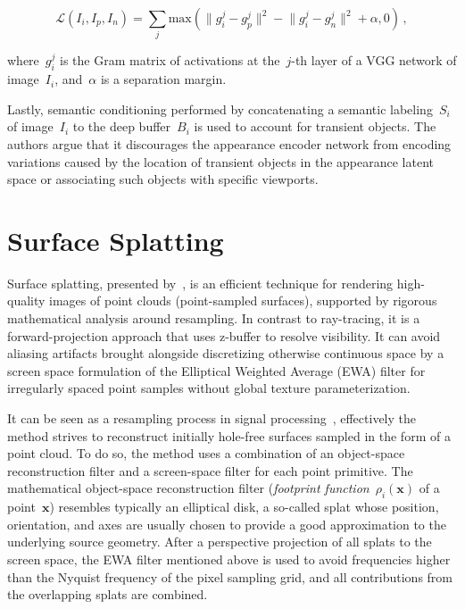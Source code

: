 $$\mathcal{L}(I_i, I_p, I_n) = \sum_j \mathrm{max}\left(\lVert g_i^j-g_p^j\rVert^2 - \lVert g_i^j-g_n^j\rVert^2 + \alpha, 0\right)\,,$$

where~$g_i^j$ is the Gram matrix of activations at the~$j$-th layer of a VGG network of image~$I_i$,
and~$\alpha$ is a separation margin.

Lastly, semantic conditioning performed by concatenating a semantic labeling~$S_i$ of
image~$I_i$ to the deep buffer~$B_i$ is used to account for transient objects. The authors argue that
it discourages the appearance encoder network from encoding variations caused by the location of
transient objects in the appearance latent space or associating such objects with specific viewports.

\section{Surface Splatting}

Surface splatting, presented by~\citet{SurfaceSplatting}, is an efficient technique for rendering high-quality
images of point clouds (point-sampled surfaces), supported by rigorous mathematical analysis around
resampling. In contrast to ray-tracing, it is a forward-projection approach that uses z-buffer to
resolve visibility. It can avoid aliasing artifacts brought alongside discretizing otherwise
continuous space by a screen space formulation of the Elliptical Weighted Average (EWA) filter for
irregularly spaced point samples without global texture parameterization.

It can be seen as a resampling process in signal processing~\citep{PointRendering}, effectively the method
strives to reconstruct initially hole-free surfaces sampled in the form of a point cloud. To do so, the method
uses a combination of an object-space reconstruction filter and a screen-space filter for each point primitive.
The mathematical object-space reconstruction filter (\emph{footprint function}~$\rho_i(\mathbf{x})$ of a point~$\mathbf{x}$)
resembles typically an elliptical disk, a so-called splat whose position, orientation, and axes are usually
chosen to provide a good approximation to the underlying source geometry. After a perspective projection of all splats
to the screen space, the EWA filter mentioned above is used to avoid frequencies higher than the Nyquist frequency
of the pixel sampling grid, and all contributions from the overlapping splats are combined.

